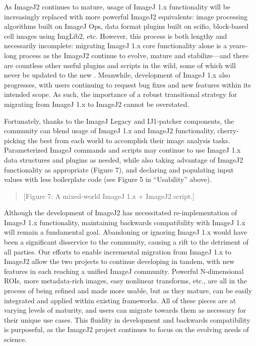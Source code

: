 \documentclass{bmcart}
\begin{document}
As ImageJ2 continues to mature, usage of ImageJ 1.x functionality will be
increasingly replaced with more powerful ImageJ2 equivalents: image processing
algorithms built on ImageJ Ops, data format plugins built on
\acrshort{scifio}, block-based cell images using ImgLib2, etc. However, this
process is both lengthy and necessarily incomplete: migrating ImageJ 1.x core
functionality alone is a years-long process as the ImageJ2 
continue to evolve, mature and stabilize---and there are countless other
useful plugins and scripts in the wild, some of which will never be updated to
the new . Meanwhile, development of ImageJ 1.x also
progresses, with users continuing to request bug fixes and new features within
its intended scope. As such, the importance of a robust transitional strategy
for migrating from ImageJ 1.x to ImageJ2 cannot be overstated.

Fortunately, thanks to the ImageJ Legacy and IJ1-patcher components, the
community can blend usage of ImageJ 1.x and ImageJ2 functionality,
cherry-picking the best from each world to accomplish their image analysis
tasks. Parameterized ImageJ commands and scripts may continue to use ImageJ 1.x
data structures and plugins as needed, while also taking advantage of ImageJ2
functionality as appropriate (Figure 7), and declaring and populating input
values with less boilerplate code (see Figure 5 in ``Usability'' above).

\begin{quote}
[Figure 7: A mixed-world ImageJ 1.x + ImageJ2 script.]
\end{quote}

Although the development of ImageJ2 has necessitated re-implementation of
ImageJ 1.x functionality, maintaining backwards compatibility with ImageJ 1.x
will remain a fundamental goal. Abandoning or ignoring ImageJ 1.x would have
been a significant disservice to the community, causing a rift to the detriment
of all parties. Our efforts to enable incremental migration from ImageJ 1.x to
ImageJ2 allow the two projects to continue developing in tandem, with new
features in each reaching a unified ImageJ community.
Powerful N-dimensional ROIs, more metadata-rich images, easy nonlinear
transforms, etc., are all in the process of being refined and made more
usable, but as they mature, can be easily integrated and applied within
existing frameworks. All of these pieces are at varying levels of maturity,
and users can migrate towards them as necessary for their unique use cases.
This fluidity in development and backwards compatibility is purposeful, as
the ImageJ2 project continues to focus on the evolving needs of science.
\end{document}
